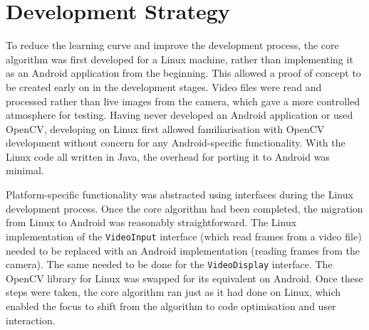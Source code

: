 \section{Development Strategy}

To reduce the learning curve and improve the development process, the core algorithm was first developed for a Linux machine, rather than implementing it as an Android application from the beginning. This allowed a proof of concept to be created early on in the development stages. Video files were read and processed rather than live images from the camera, which gave a more controlled atmosphere for testing. Having never developed an Android application or used OpenCV, developing on Linux first allowed familiarisation with OpenCV development without concern for any Android-specific functionality. With the Linux code all written in Java, the overhead for porting it to Android was minimal.

Platform-specific functionality was abstracted using interfaces during the Linux development process. Once the core algorithm had been completed, the migration from Linux to Android was reasonably straightforward. The Linux implementation of the \texttt{VideoInput} interface (which read frames from a video file) needed to be replaced with an Android implementation (reading frames from the camera). The same needed to be done for the \texttt{VideoDisplay} interface. The OpenCV library for Linux was swapped for its equivalent on Android. Once these steps were taken, the core algorithm ran just as it had done on Linux, which enabled the focus to shift from the algorithm to code optimisation and user interaction.